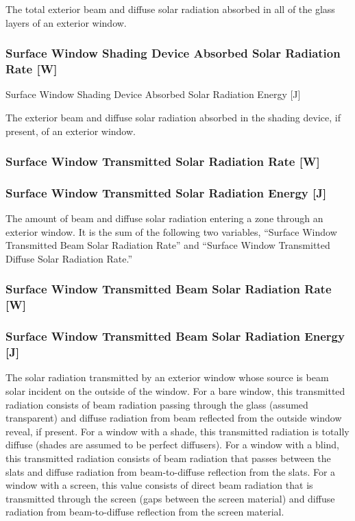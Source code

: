 The total exterior beam and diffuse solar radiation absorbed in all of the glass layers of an exterior window.

\subsubsection{Surface Window Shading Device Absorbed Solar Radiation Rate {[}W{]}}\label{surface-window-shading-device-absorbed-solar-radiation-rate-w}

Surface Window Shading Device Absorbed Solar Radiation Energy {[}J{]}

The exterior beam and diffuse solar radiation absorbed in the shading device, if present, of an exterior window.

\subsubsection{Surface Window Transmitted Solar Radiation Rate {[}W{]}}\label{surface-window-transmitted-solar-radiation-rate-w}

\subsubsection{Surface Window Transmitted Solar Radiation Energy {[}J{]}}\label{surface-window-transmitted-solar-radiation-energy-j}

The amount of beam and diffuse solar radiation entering a zone through an exterior window. It is the sum of the following two variables, ``Surface Window Transmitted Beam Solar Radiation Rate'' and ``Surface Window Transmitted Diffuse Solar Radiation Rate.''

\subsubsection{Surface Window Transmitted Beam Solar Radiation Rate {[}W{]}}\label{surface-window-transmitted-beam-solar-radiation-rate-w}

\subsubsection{Surface Window Transmitted Beam Solar Radiation Energy {[}J{]}}\label{surface-window-transmitted-beam-solar-radiation-energy-j}

The solar radiation transmitted by an exterior window whose source is beam solar incident on the outside of the window. For a bare window, this transmitted radiation consists of beam radiation passing through the glass (assumed transparent) and diffuse radiation from beam reflected from the outside window reveal, if present. For a window with a shade, this transmitted radiation is totally diffuse (shades are assumed to be perfect diffusers). For a window with a blind, this transmitted radiation consists of beam radiation that passes between the slats and diffuse radiation from beam-to-diffuse reflection from the slats. For a window with a screen, this value consists of direct beam radiation that is transmitted through the screen (gaps between the screen material) and diffuse radiation from beam-to-diffuse reflection from the screen material.

